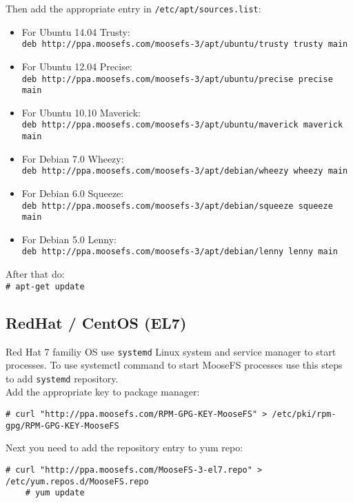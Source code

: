 \documentclass[a4paper,11pt,english]{report}
\def\code#1{\texttt{#1}}
\begin{document}
			\bigskip
			Then add the appropriate entry in \code{/etc/apt/sources.list}:
			\begin{itemize}
				\item For Ubuntu 14.04 Trusty: \\
					\code{deb http://ppa.moosefs.com/moosefs-3/apt/ubuntu/trusty trusty main}
				\item For Ubuntu 12.04 Precise: \\
					\code{deb http://ppa.moosefs.com/moosefs-3/apt/ubuntu/precise precise main}
				\item For Ubuntu 10.10 Maverick: \\
					\code{deb http://ppa.moosefs.com/moosefs-3/apt/ubuntu/maverick maverick main}
				\item For Debian 7.0 Wheezy: \\
					\code{deb http://ppa.moosefs.com/moosefs-3/apt/debian/wheezy wheezy main}
				\item For Debian 6.0 Squeeze: \\
					\code{deb http://ppa.moosefs.com/moosefs-3/apt/debian/squeeze squeeze main}
				\item For Debian 5.0 Lenny: \\
					\code{deb http://ppa.moosefs.com/moosefs-3/apt/debian/lenny lenny main}
			\end{itemize}

			\bigskip
			After that do: \\
			\code{\# apt-get update}

			\subsection{RedHat / CentOS (EL7)}
			Red Hat 7 familiy OS use \code{systemd} Linux system and service manager to start processes. To use systemctl command to start MooseFS processes use this steps to add \code{systemd} repository.\\
			
			Add the appropriate key to package manager:
			\begin{lstlisting}[caption={Adding the repo key}]
	# curl "http://ppa.moosefs.com/RPM-GPG-KEY-MooseFS" > /etc/pki/rpm-gpg/RPM-GPG-KEY-MooseFS
			\end{lstlisting}

			Next you need to add the repository entry to yum repo:
			\begin{lstlisting}[caption={Adding MooseFS repo}]
	# curl "http://ppa.moosefs.com/MooseFS-3-el7.repo" > /etc/yum.repos.d/MooseFS.repo
	# yum update
			\end{lstlisting}
			
\end{document}
